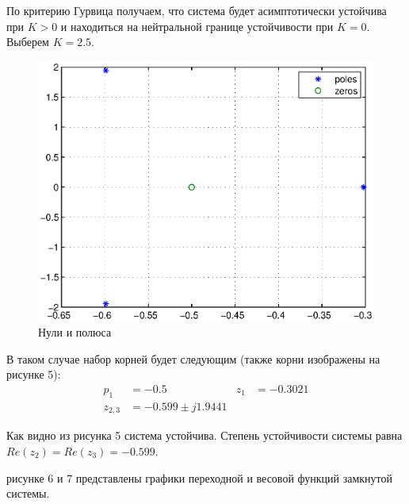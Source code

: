\documentclass[a4paper, 12pt]{article}
\begin{document}
\par 
По критерию Гурвица получаем, что система будет асимптотически устойчива при $K > 0$ и находиться на нейтральной границе устойчивости при $K=0$. Выберем $K=2.5$.
    \begin{figure} [H]
        \centering
		\includegraphics[scale=0.8]{image/pole2.eps}
        \caption{Нули и полюса}
    \end{figure}

    В таком случае набор корней будет следующим (также корни изображены на рисунке 5):
    \begin{align*}
        p_1 & = -0.5 & 
        z_1 & =  -0.3021 \\
        z_{2, 3} & =  -0.599 \pm j1.9441 &
    \end{align*} \par
    Как видно из рисунка 5 система устойчива. Степень устойчивости системы равна $Re(z_2) = Re(z_3) = -0.599$.

 рисунке 6 и 7 представлены графики переходной и весовой функций замкнутой системы.
\end{document}
